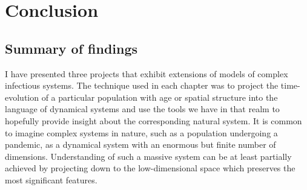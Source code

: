 
\chapter{Conclusion}

\section{Summary of findings}

I have presented three projects that exhibit extensions of models of complex infectious systems. The technique used in each chapter was to project the time-evolution of a particular population with age or spatial structure into the language of dynamical systems and use the tools we have in that realm to hopefully provide insight about the corresponding natural system. It is common to imagine complex systems in nature, such as a population undergoing a pandemic, as a dynamical system with an enormous but finite number of dimensions. Understanding of such a massive system can be at least partially achieved by projecting down to the low-dimensional space which preserves the most significant features. 

